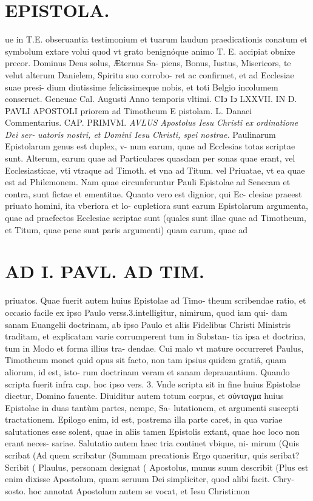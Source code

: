\documentclass{article}
\begin{document}
\begin{pages}
\section*{EPISTOLA. }ue in T.E. obseruantia testimonium et tuarum laudum praedicationis conatum et symbolum extare volui quod vt grato benignóque animo T. E. accipiat obnixe precor. Dominus Deus solus, Æternus Sa- piens, Bonus, Iustus, Misericors, te velut alterum Danielem, Spiritu suo corrobo- ret ac confirmet, et ad Ecclesiae suae presi- dium diutissime felicissimeque nobis, et toti Belgio incolumem conseruet. Geneuae Cal. Augusti Anno temporis vltimi. CIↄ Iↄ LXXVII. IN D. PAVLI APOSTOLI priorem ad Timotheum E pistolam. L. Danaei Commentarius. CAP. PRIMVM. \textit{AVLUS Apostolus Iesu} \textit{Christi ex ordinatione Dei ser-} \textit{uatoris nostri, et Domini Iesu} \textit{Christi, spei nostrae.} Paulinarum Epistolarum genus est duplex, v- num earum, quae ad Ecclesias totas scriptae sunt. Alterum, earum quae ad Particulares quasdam per sonas quae erant, vel Ecclesiasticae, vti vtraque ad Timoth. et vna ad Titum. vel Priuatae, vt ea quae est ad Philemonem. Nam quae circunferuntur Pauli Epistolae ad Senecam et contra, sunt fictae et ementitae. Quanto vero est dignior, qui Ec- clesiae praeest priuato homini, ita vberiora et lo- cupletiora sunt earum Epistolarum argumenta, quae ad praefectos Ecclesiae scriptae sunt (quales sunt illae quae ad Timotheum, et Titum, quae pene sunt paris argumenti) quam earum, quae ad 
\textbf{}
\section*{AD I. PAVL. AD TIM. }
\marginpar{[ p.2 ]}priuatos. Quae fuerit autem huius Epistolae ad Timo- theum scribendae ratio, et occasio facile ex ipso Paulo verss.3.intelligitur, nimirum, quod iam qui- dam sanam Euangelii doctrinam, ab ipso Paulo et aliis Fidelibus Christi Ministris traditam, et explicatam varie corrumperent tum in Substan- tia ipsa et doctrina, tum in Modo et forma illius tra- dendae. Cui malo vt mature occurreret Paulus, Timotheum monet quid opus sit facto, non tam ipsius quidem gratiâ, quam aliorum, id est, isto- rum doctrinam veram et sanam deprauantium. Quando scripta fuerit infra cap. hoc ipso vers. 3. Vnde scripta sit in fine huius Epistolae dicetur, Domino fauente. Diuiditur autem totum corpus, et σύνταγμα huius Epistolae in duas tantùm partes, nempe, Sa- lutationem, et argumenti suscepti tractationem. Epilogo enim, id est, postrema illa parte caret, in qua variae salutationes esse solent, quae in aliis tamen Epistolis extant, quae hoc loco non erant neces- sariae. Salutatio autem haec tria continet vbique, ni- mirum (Quis scribat (Ad quem scribatur (Summam precationis Ergo quaeritur, quis seribat? Scribit ( Plaulus, personam designat ( Apostolus, munus suum describit (Plus est enim dixisse Apostolum, quam seruum Dei simpliciter, quod alibi facit. Chry- sosto. hoc annotat Apostolum autem se vocat, et Iesu Christi:non 

\end{pages}
\end{document}
